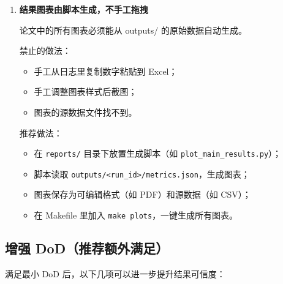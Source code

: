 \begin{enumerate}
  \textbf{实现建议：}用一个极小的数据子集（比如 10 个样本），跑 2-3 个迭代，确保流程完整。

  \item \textbf{结果图表由脚本生成，不手工拖拽}

  论文中的所有图表必须能从 outputs/ 的原始数据自动生成。

  禁止的做法：
  \begin{itemize}
    \item 手工从日志里复制数字粘贴到 Excel；
    \item 手工调整图表样式后截图；
    \item 图表的源数据文件找不到。
  \end{itemize}

  推荐做法：
  \begin{itemize}
    \item 在 \texttt{reports/} 目录下放置生成脚本（如 \texttt{plot\_main\_results.py}）；
    \item 脚本读取 \texttt{outputs/<run\_id>/metrics.json}，生成图表；
    \item 图表保存为可编辑格式（如 PDF）和源数据（如 CSV）；
    \item 在 Makefile 里加入 \texttt{make plots}，一键生成所有图表。
  \end{itemize}
\end{enumerate}

\subsection{增强 DoD（推荐额外满足）}

满足最小 DoD 后，以下几项可以进一步提升结果可信度：

